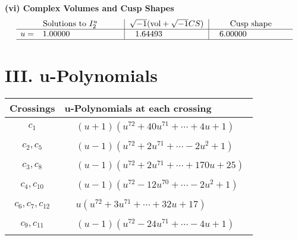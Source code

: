\documentclass[1p]{elsarticle_modified}
\theoremstyle{definition}
\newcommand{\I}{\sqrt{-1}}
\begin{document}
\newpage\flushleft \textbf{(vi) Complex Volumes and Cusp Shapes}
$$\begin{array}{c|c|c}  
\text{Solutions to }I^u_{2}& \I (\text{vol} + \sqrt{-1}CS) & \text{Cusp shape}\\
 \hline 
\begin{aligned}
u &= \phantom{-}1.00000\phantom{ +0.000000I}\end{aligned}
 & \phantom{-}1.64493\phantom{ +0.000000I} & \phantom{-}6.00000\phantom{ +0.000000I}\\
 \hline 
 \end{array}$$\newpage
\newpage\renewcommand{\arraystretch}{1}
\centering \section*{ III. u-Polynomials}
\begin{tabular}{m{50pt}|m{274pt}}
Crossings & \hspace{64pt}u-Polynomials at each crossing \\
\hline $$\begin{aligned}c_{1}\end{aligned}$$&$\begin{aligned}
&(u+1)(u^{72}+40 u^{71}+\cdots+4 u+1)
\end{aligned}$\\
\hline $$\begin{aligned}c_{2},c_{5}\end{aligned}$$&$\begin{aligned}
&(u-1)(u^{72}+2 u^{71}+\cdots-2 u^2+1)
\end{aligned}$\\
\hline $$\begin{aligned}c_{3},c_{8}\end{aligned}$$&$\begin{aligned}
&(u-1)(u^{72}+2 u^{71}+\cdots+170 u+25)
\end{aligned}$\\
\hline $$\begin{aligned}c_{4},c_{10}\end{aligned}$$&$\begin{aligned}
&(u-1)(u^{72}-12 u^{70}+\cdots-2 u^2+1)
\end{aligned}$\\
\hline $$\begin{aligned}c_{6},c_{7},c_{12}\end{aligned}$$&$\begin{aligned}
&u(u^{72}+3 u^{71}+\cdots+32 u+17)
\end{aligned}$\\
\hline $$\begin{aligned}c_{9},c_{11}\end{aligned}$$&$\begin{aligned}
&(u-1)(u^{72}-24 u^{71}+\cdots-4 u+1)
\end{aligned}$\\
\hline
\end{tabular}\newpage\renewcommand{\arraystretch}{1}
\end{document}
